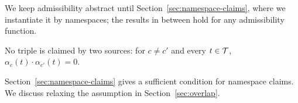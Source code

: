We keep admissibility abstract until Section~\ref{sec:namespace-claims}, where we
instantiate it by namespaces; the results in between hold for any admissibility function.

\begin{assumption}
\label{as:disjoint}
No triple is claimed by two sources: for $c \neq c'$ and every $t \in \mathcal{T}$,
$\alpha_c(t) \cdot \alpha_{c'}(t) = 0$.
\end{assumption}

Section~\ref{sec:namespace-claims} gives a sufficient condition for namespace claims. We
discuss relaxing the assumption in Section~\ref{sec:overlap}.~







